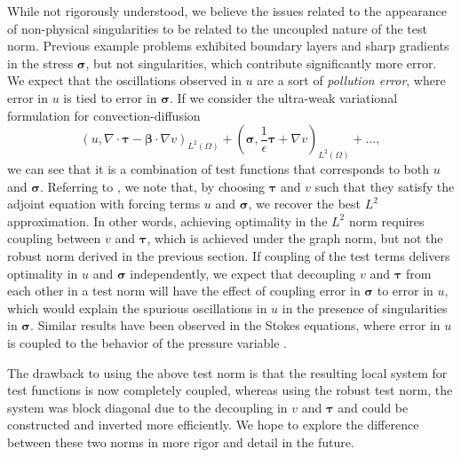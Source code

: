 \documentclass[letterpaper]{article}
\def\btau{\boldsymbol\tau}
\def\bsigma{\boldsymbol\sigma}
\def\bbeta{\boldsymbol\beta}
\newcommand{\LRp}[1]{\left( #1 \right)}
\renewcommand{\L}{L^2\LRp{\Omega}}
\newcommand{\grad}{\nabla}
\renewcommand{\div}{\grad \cdot}
\begin{document}
While not rigorously understood, we believe the issues related to the
appearance of non-physical singularities to be related to the uncoupled nature
of the test norm.  Previous example problems exhibited boundary layers and
sharp gradients in the stress $\bsigma$, but not singularities, which
contribute significantly more error.  We expect that the oscillations observed
in $u$ are a sort of \textit{pollution error}, where error in $u$ is tied to
error in $\bsigma$.  If we consider the ultra-weak variational formulation for
convection-diffusion
\[
\LRp{u,\div \btau - \bbeta\cdot \grad v}_{\L} + \LRp{\bsigma,\frac{1}{\epsilon}
\btau + \grad v}_{\L} + \ldots,
\]
we can see that it is a combination of test functions that corresponds to both
$u$ and $\bsigma$.  Referring to \cite{ChanHeuerThanhDemkowicz2012}, we note
that, by choosing $\btau$
and $v$ such that they satisfy the adjoint equation with forcing terms $u$ and
$\bsigma$, we recover the best $L^2$ approximation.  In other words, achieving
optimality in the $L^2$ norm requires coupling between $v$ and $\btau$, which
is achieved under the graph norm, but not the robust norm derived in the
previous section.
If coupling of the test terms delivers optimality in $u$ and $\bsigma$
independently, we expect that decoupling
$v$ and $\btau$ from each other in a test norm will have the
effect of coupling error in $\bsigma$ to error in $u$, which would explain the
spurious oscillations in $u$ in the presence of singularities in $\bsigma$.
Similar results have been observed in the Stokes equations, where error in $u$
is coupled to the behavior of the pressure variable \cite{FLD:FLD582}.

The drawback to using the above test norm is that the resulting local system
for test functions is now completely coupled, whereas using the robust test
norm, the system was block diagonal due to the decoupling in $v$ and $\btau$
and could be constructed and inverted more efficiently.  We hope to explore
the difference between these two norms in more rigor and detail in the
future.
\end{document}
